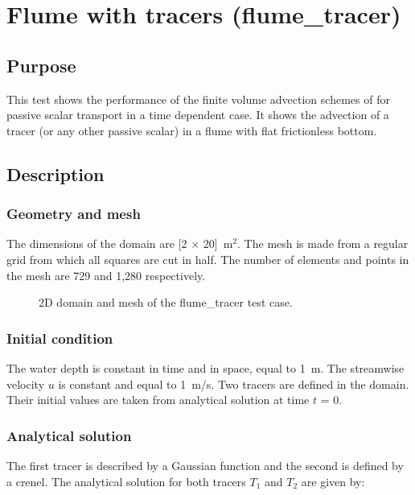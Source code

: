 \chapter{Flume with tracers (flume\_tracer)}

\section{Purpose}
This test shows the performance of the finite volume advection schemes of
 for passive scalar transport in a time dependent case.
It shows the advection of a tracer (or any other passive scalar) in a flume with
flat frictionless bottom.

\section{Description}

\subsection{Geometry and mesh}

The dimensions of the domain are [2 $\times$ 20]~m$^2$.
The mesh is made from a regular grid from which all squares are cut in half.
The number of elements and points in the mesh are 729 and 1,280 respectively.

\begin{figure}[h!]
\centering
{}
\caption{2D domain and mesh of the flume\_tracer test case.}
\label{t2d:flumetracer:mesh}
\end{figure}

\subsection{Initial condition}

The water depth is constant in time and in space, equal to 1~m.
The streamwise velocity $u$ is constant and equal to 1~m/s.
Two tracers are defined in the domain.
Their initial values are taken from analytical solution at time $t$ = 0.

\subsection{Analytical solution}

The first tracer is described by a Gaussian function and the second is defined
by a crenel.
The analytical solution for both tracers $T_1$ and $T_2$ are given by:

